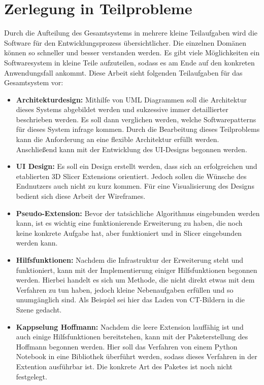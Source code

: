 \section{Zerlegung in Teilprobleme}
\label{sec_zerlegung_in_teilprobleme} Durch die Aufteilung des Gesamtsystems in mehrere
kleine Teilaufgaben wird die Software für den Entwicklungsprozess übersichtlicher.
Die einzelnen Domänen können so schneller und besser verstanden werden. Es gibt viele
Möglichkeiten ein Softwaresystem in kleine Teile aufzuteilen, sodass es am Ende
auf den konkreten Anwendungsfall ankommt. Diese Arbeit sieht folgenden Teilaufgaben
für das Gesamtsystem vor:

\begin{itemize}
	\item \textbf{Architekturdesign:} Mithilfe von UML Diagrammen soll die
		Architektur dieses Systems abgebildet werden und sukzessive immer
		detaillierter beschrieben werden. Es soll dann verglichen werden, welche
		Softwarepatterns für dieses System infrage kommen. Durch die Bearbeitung dieses
		Teilproblems kann die Anforderung an eine flexible Architektur erfüllt werden.
		Anschließend kann mit der Entwicklung des UI-Designs begonnen werden.

	\item \textbf{UI Design:} Es soll ein Design erstellt werden, dass sich an erfolgreichen
		und etablierten 3D Slicer Extensions orientiert. Jedoch sollen die Wünsche
		des Endnutzers auch nicht zu kurz kommen. Für eine Visualisierung des Designs
		bedient sich diese Arbeit der Wireframes.

	\item \textbf{Pseudo-Extension:} Bevor der tatsächliche Algorithmus
		eingebunden werden kann, ist es wichtig eine funktionierende Erweiterung zu haben,
		die noch keine konkrete Aufgabe hat, aber funktioniert und in Slicer eingebunden
		werden kann.

	\item \textbf{Hilfsfunktionen:} Nachdem die Infrastruktur der Erweiterung
		steht und funktioniert, kann mit der Implementierung einiger Hilfsfunktionen
		begonnen werden. Hierbei handelt es sich um Methode, die nicht direkt etwas mit
		dem Verfahren zu tun haben, jedoch kleine Nebenaufgaben erfüllen und so
		unumgänglich sind. Als Beispiel sei hier das Laden von CT-Bildern in die Szene
		gedacht.

	\item \textbf{Kappselung Hoffmann:} Nachdem die leere Extension
		lauffähig ist und auch einige Hilfsfunktionen bereitstehen, kann mit der Paketerstellung
		des Hoffmann begonnen werden. Hier soll das Verfahren von einem Python
		Notebook in eine Bibliothek überführt werden, sodass dieses Verfahren in der
		Extention ausführbar ist. Die konkrete Art des Paketes ist noch nicht
		festgelegt.


\end{itemize}
